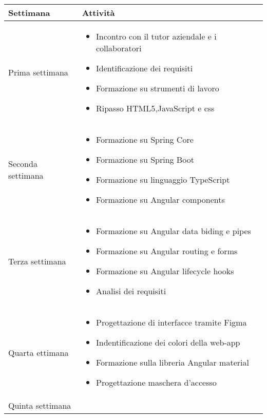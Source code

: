 \begin{center}
    \renewcommand{\arraystretch}{1.5}
    \begin{longtable}{ |p{3cm}|p{9cm}|  }
        \hline
        Settimana&Attività \\
        \hline
        \endhead
        Prima settimana&\begin{itemize}
            \item Incontro con il tutor aziendale e i collaboratori
            \item Identificazione dei requisiti
            \item Formazione su strumenti di lavoro
            \item Ripasso HTML5,JavaScript e css
        \end{itemize}\\
        Seconda settimana& \begin{itemize}
            \item Formazione su Spring Core
            \item Formazione su Spring Boot
            \item Formazione su linguaggio TypeScript
            \item Formazione su Angular components
        \end{itemize}\\ 
        Terza settimana&\begin{itemize}
            \item Formazione su Angular data biding e pipes
            \item Formazione su Angular routing e forms
            \item Formazione su Angular lifecycle hooks
            \item Analisi dei requisiti
        \end{itemize}\\
        Quarta ettimana&\begin{itemize}
            \item Progettazione di interfacce tramite Figma
            \item Indentificazione dei colori della web-app
            \item Formazione sulla libreria Angular material
            \item Progettazione maschera d'accesso
        \end{itemize}\\
        Quinta settimana&\begin{itemize}

\end{itemize}
\end{longtable}
\end{center}

